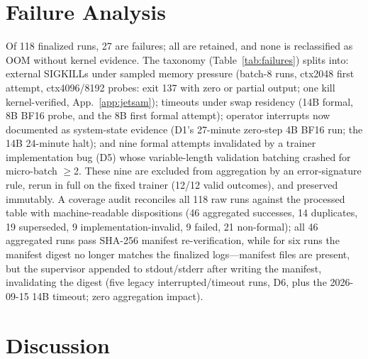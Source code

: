 \documentclass[10pt,twocolumn]{article}
\begin{document}
\section{Failure Analysis}
Of 118 finalized runs, 27 are failures; all are retained, and none is
reclassified as OOM without kernel evidence. The taxonomy
(Table~\ref{tab:failures}) splits into: external SIGKILLs under
sampled memory pressure (batch-8 runs, ctx2048 first attempt,
ctx4096/8192 probes: exit 137 with zero or partial output; one kill
kernel-verified, App.~\ref{app:jetsam}); timeouts under swap residency
(14B formal, 8B BF16 probe, and the 8B first formal attempt);
operator interrupts now documented as system-state evidence (D1's
27-minute zero-step 4B BF16 run; the 14B 24-minute halt); and nine
formal attempts invalidated by a
trainer implementation bug (D5) whose variable-length validation
batching crashed for micro-batch $\ge$2. These nine are excluded from
aggregation by an error-signature rule, rerun in full on the fixed
trainer (12/12 valid outcomes), and preserved immutably. A coverage
audit reconciles all 118 raw runs against the processed table with
machine-readable dispositions (46 aggregated successes, 14 duplicates,
19 superseded, 9 implementation-invalid, 9 failed, 21 non-formal); all
46 aggregated runs pass SHA-256 manifest re-verification, while for six
runs the manifest digest no longer matches the finalized
logs---manifest files are present, but the supervisor appended to
stdout/stderr after writing the manifest, invalidating the digest
(five legacy interrupted/timeout runs, D6, plus
the 2026-09-15 14B timeout; zero aggregation impact).


\section{Discussion}
\end{document}
